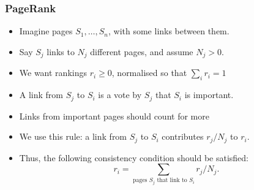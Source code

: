 \documentclass[9pt]{beamer}
\begin{document}
\begin{frame}[t]
 \frametitle{PageRank}
 

 \bigskip
 \begin{itemize}
  \item<4-> Imagine pages $S_1,\dotsc,S_n$, with some links between them.  
  \item<5-> Say $S_j$ links to $N_j$ different pages, and assume $N_j>0$.
  \item<6-> We want rankings $r_i\geq 0$, normalised so that
   $\sum_ir_i=1$
  \item<8-> A link from $S_j$ to $S_i$ is a vote by $S_j$ that $S_i$ is
   important. 
  \item<9-> Links from important pages should count for more
  \item<11-> We use this rule: a link from $S_j$ to $S_i$ contributes
   $r_j/N_j$ to $r_i$. 
  \item<12-> Thus, the following consistency condition should be satisfied:
   \[ r_i = \sum_{\text{pages $S_j$ that link to $S_i$}} r_j/N_j. \]
 \end{itemize}
\end{frame}
\end{document}
